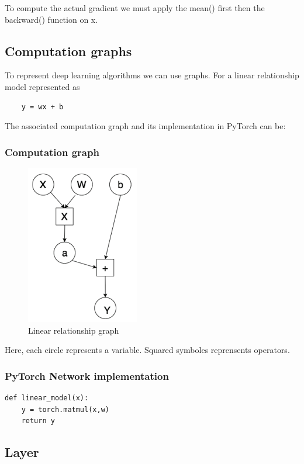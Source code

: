 To compute the actual gradient we must apply the mean() first then the backward() function on x.

\subsection{Computation graphs}
\noindent To represent deep learning algorithms we can use graphs. For a linear relationship model represented as \begin{lstlisting}
    y = wx + b
\end{lstlisting} 
The associated computation graph and its implementation in PyTorch can be:

\subsubsection{Computation graph}
\begin{figure}[!ht]
    \center
    \includegraphics[scale=0.8]{figures/lineasr.png}
    \caption{Linear relationship graph }
\end{figure}

Here, each circle represents a variable. Squared symboles reprensents operators. 

\subsubsection{PyTorch Network implementation}
\begin{lstlisting}
def linear_model(x):
    y = torch.matmul(x,w) 
    return y
\end{lstlisting}

\subsection{Layer}
